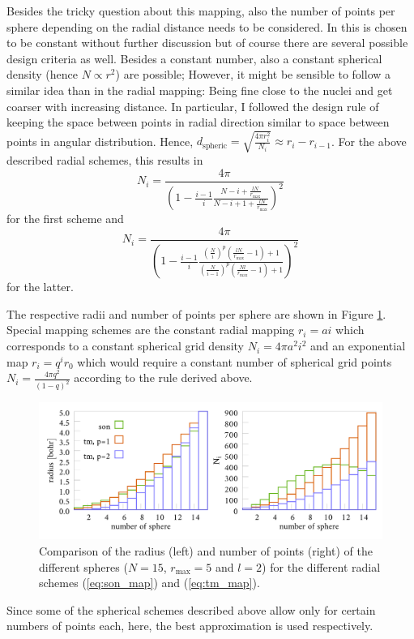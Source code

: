 Besides the tricky question about this mapping, also the number of points per sphere depending on the radial distance needs to be considered. 
In \cite{Son_Chu0} this is chosen to be constant without further discussion but of course there are several possible design criteria as well.
Besides a constant number, also a constant spherical density (hence $N\propto r^2$) are possible; However, it might be sensible to follow a similar idea than in the radial mapping: Being fine close to the nuclei and get coarser with increasing distance.
In particular, I followed the design rule of keeping the space between points in radial direction similar to space between points in angular distribution.
Hence, $d_\text{spheric}=\sqrt{\frac{4\pi r_i^2}{N_i}}\approx r_i-r_{i-1}$.
For the above described radial schemes, this results in 
\begin{equation}\label{eq:tm_num}
N_i= \frac{4\pi}{ \left(1-\frac{i-1 }{i}\frac{N-i+\frac{lN}{r_\text{max}}}{N-i+1+\frac{lN}{r_\text{max}}}\right)^2 }
\end{equation}
for the first scheme and 
\begin{equation} \label{eq:son_num}
N_i= \frac{4\pi}{\left(1-\frac{i-1 }{i}\frac{ (\frac{N}{i})^p \left(\frac{lN}{r_\text{max}}-1\right)+1}{ (\frac{N}{i-1})^p\left( \frac{Nl}{r_\text{max}} -1 \right) +1 } \right)^2 }
\end{equation}
for the latter.

The respective radii and number of points per sphere are shown in Figure \ref{fig:maps}.\\
Special mapping schemes are the constant radial mapping $r_i=a i$ which corresponds to a constant spherical grid density $N_i=4\pi a^2 i^2$ and an exponential map $r_i=q^i r_0$ which would require a constant number of spherical grid points $N_i=\frac{4\pi q^2}{(1-q)^2}$ according to the rule derived above.

\begin{figure}
\includegraphics[width=\textwidth]{Data/radial_mapping}
\caption{Comparison of the radius (left) and number of points (right) of the different spheres ($N=15$, $r_\text{max}=5$ and $l=2$) for the different radial schemes (\ref{eq:son_map}) and (\ref{eq:tm_map}).}
\label{fig:maps}
\end{figure}

Since some of the spherical schemes described above allow only for certain numbers of points each, here, the best approximation is used respectively.
